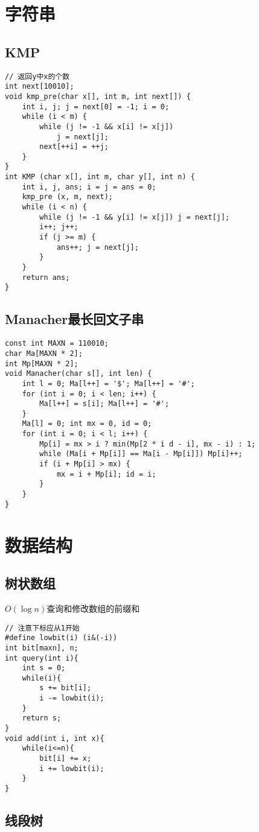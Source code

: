 \documentclass[a4]{article}
\begin{document}
\section{字符串}
\subsection{KMP}
\begin{lstlisting}
// 返回y中x的个数
int next[10010];
void kmp_pre(char x[], int m, int next[]) {
    int i, j; j = next[0] = -1; i = 0;
    while (i < m) {
        while (j != -1 && x[i] != x[j])
            j = next[j];
        next[++i] = ++j;
    }
}
int KMP (char x[], int m, char y[], int n) {
    int i, j, ans; i = j = ans = 0;
    kmp_pre (x, m, next);
    while (i < n) {
        while (j != -1 && y[i] != x[j]) j = next[j];
        i++; j++;
        if (j >= m) {
            ans++; j = next[j];
        }
    }
    return ans;
}
\end{lstlisting}
\subsection{Manacher最长回文子串}
\begin{lstlisting}
const int MAXN = 110010;
char Ma[MAXN * 2];
int Mp[MAXN * 2];
void Manacher(char s[], int len) {
    int l = 0; Ma[l++] = '$'; Ma[l++] = '#';
    for (int i = 0; i < len; i++) {
        Ma[l++] = s[i]; Ma[l++] = '#';
    }
    Ma[l] = 0; int mx = 0, id = 0;
    for (int i = 0; i < l; i++) {
        Mp[i] = mx > i ? min(Mp[2 * i d - i], mx - i) : 1;
        while (Ma[i + Mp[i]] == Ma[i - Mp[i]]) Mp[i]++;
        if (i + Mp[i] > mx) {
            mx = i + Mp[i]; id = i;
        }
    }
}
\end{lstlisting}
\clearpage
\section{数据结构}
\subsection{树状数组}
$O(\log n)$查询和修改数组的前缀和\begin{lstlisting}
// 注意下标应从1开始
#define lowbit(i) (i&(-i))
int bit[maxn], n; 
int query(int i){
	int s = 0;
	while(i){
		s += bit[i];
		i -= lowbit(i);
	}
	return s;
}
void add(int i, int x){
	while(i<=n){
		bit[i] += x;
		i += lowbit(i);
	}
}
\end{lstlisting}
\subsection{线段树}
\end{document}
